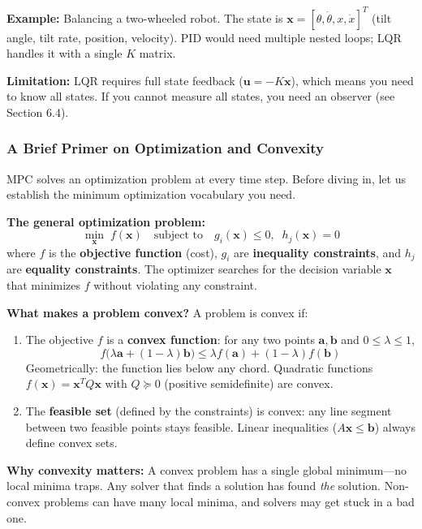 \textbf{Example:} Balancing a two-wheeled robot. The state is $\mathbf{x} = [\theta, \dot{\theta}, x, \dot{x}]^T$ (tilt angle, tilt rate, position, velocity). PID would need multiple nested loops; LQR handles it with a single $K$ matrix.

\textbf{Limitation:} LQR requires full state feedback ($\mathbf{u} = -K\mathbf{x}$), which means you need to know all states. If you cannot measure all states, you need an observer (see Section 6.4).

\subsubsection{A Brief Primer on Optimization and Convexity}

MPC solves an optimization problem at every time step. Before diving in, let us establish the minimum optimization vocabulary you need.

\textbf{The general optimization problem:}
\[
\min_{\mathbf{x}} \; f(\mathbf{x}) \quad \text{subject to} \quad g_i(\mathbf{x}) \leq 0, \;\; h_j(\mathbf{x}) = 0
\]
where $f$ is the \textbf{objective function} (cost), $g_i$ are \textbf{inequality constraints}, and $h_j$ are \textbf{equality constraints}. The optimizer searches for the decision variable $\mathbf{x}$ that minimizes $f$ without violating any constraint.

\textbf{What makes a problem convex?} A problem is convex if:
\begin{enumerate}[nosep]
    \item The objective $f$ is a \textbf{convex function}: for any two points $\mathbf{a}, \mathbf{b}$ and $0 \leq \lambda \leq 1$,
    \[
    f\bigl(\lambda \mathbf{a} + (1-\lambda)\mathbf{b}\bigr) \leq \lambda f(\mathbf{a}) + (1-\lambda) f(\mathbf{b})
    \]
    Geometrically: the function lies below any chord. Quadratic functions $f(\mathbf{x}) = \mathbf{x}^T Q \mathbf{x}$ with $Q \succeq 0$ (positive semidefinite) are convex.
    \item The \textbf{feasible set} (defined by the constraints) is convex: any line segment between two feasible points stays feasible. Linear inequalities ($A\mathbf{x} \leq \mathbf{b}$) always define convex sets.
\end{enumerate}

\textbf{Why convexity matters:} A convex problem has a single global minimum---no local minima traps. Any solver that finds a solution has found \textit{the} solution. Non-convex problems can have many local minima, and solvers may get stuck in a bad one.

